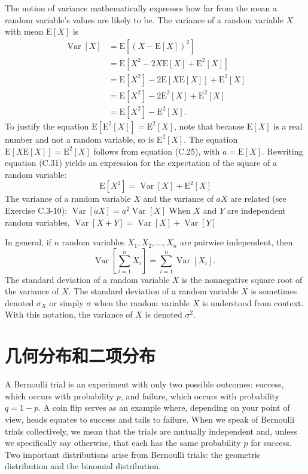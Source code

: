 \documentclass[lang=cn,newtx,10pt,scheme=chinese]{elegantbook}
\begin{document}
The notion of variance mathematically expresses how far from the mean a random variable's values are likely to be. The variance of a random variable $X$ with mean $\mathrm{E}[X]$ is
$$
\begin{aligned}
\operatorname{Var}[X] & =\mathrm{E}\left[(X-\mathrm{E}[X])^2\right] \\
& =\mathrm{E}\left[X^2-2 X \mathrm{E}[X]+\mathrm{E}^2[X]\right] \\
& =\mathrm{E}\left[X^2\right]-2 \mathrm{E}[X \mathrm{E}[X]]+\mathrm{E}^2[X] \\
& =\mathrm{E}\left[X^2\right]-2 \mathrm{E}^2[X]+\mathrm{E}^2[X] \\
& =\mathrm{E}\left[X^2\right]-\mathrm{E}^2[X] .
\end{aligned}
$$
To justify the equation $\mathrm{E}\left[\mathrm{E}^2[X]\right]=\mathrm{E}^2[X]$, note that because $\mathrm{E}[X]$ is a real number and not a random variable, so is $\mathrm{E}^2[X]$. The equation $\mathrm{E}[X \mathrm{E}[X]]=\mathrm{E}^2[X]$ follows from equation (C.25), with $a=\mathrm{E}[X]$. Rewriting equation (C.31) yields an expression for the expectation of the square of a random variable:
$$
\mathrm{E}\left[X^2\right]=\operatorname{Var}[X]+\mathrm{E}^2[X]
$$
The variance of a random variable $X$ and the variance of $a X$ are related (see Exercise C.3-10):
$\operatorname{Var}[a X]=a^2 \operatorname{Var}[X]$
When $X$ and $Y$ are independent random variables,
$\operatorname{Var}[X+Y]=\operatorname{Var}[X]+\operatorname{Var}[Y]$

In general, if $n$ random variables $X_1, X_2, \ldots, X_n$ are pairwise independent, then
$$
\operatorname{Var}\left[\sum_{i=1}^n X_i\right]=\sum_{i=1}^n \operatorname{Var}\left[X_i\right] \text {. }
$$
The standard deviation of a random variable $X$ is the nonnegative square root of the variance of $X$. The standard deviation of a random variable $X$ is sometimes denoted $\sigma_X$ or simply $\sigma$ when the random variable $X$ is understood from context. With this notation, the variance of $X$ is denoted $\sigma^2$.

\section{几何分布和二项分布}

A Bernoulli trial is an experiment with only two possible outcomes: success, which occurs with probability $p$, and failure, which occurs with probability $q=1-p$. A coin flip serves as an example where, depending on your point of view, heads equates to success and tails to failure. When we speak of Bernoulli trials collectively, we mean that the trials are mutually independent and, unless we specifically say otherwise, that each has the same probability $p$ for success. Two important distributions arise from Bernoulli trials: the geometric distribution and the binomial distribution.
\end{document}
